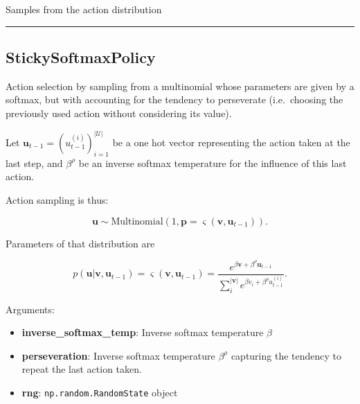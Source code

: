 \begin{Shaded}
\begin{Highlighting}[]
\end{Highlighting}
\end{Shaded}

Samples from the action distribution

\begin{center}\rule{0.5\linewidth}{\linethickness}\end{center}

\subsection{StickySoftmaxPolicy}\label{stickysoftmaxpolicy}

\begin{Shaded}
\begin{Highlighting}[]
\end{Highlighting}
\end{Shaded}

Action selection by sampling from a multinomial whose parameters are
given by a softmax, but with accounting for the tendency to perseverate
(i.e.~choosing the previously used action without considering its
value).

Let \(\mathbf u_{t-1} = (u_{t-1}^{(i)})_{i=1}^{|\mathcal U|}\) be a one
hot vector representing the action taken at the last step, and
\(\beta^\rho\) be an inverse softmax temperature for the influence of
this last action.

Action sampling is thus:

\[
\mathbf u \sim \mathrm{Multinomial}(1, \mathbf p=\varsigma(\mathbf v, \mathbf u_{t-1})).
\]

Parameters of that distribution are

\[
p(\mathbf u|\mathbf v, \mathbf u_{t-1}) = \varsigma(\mathbf v, \mathbf u_{t-1}) = \frac{e^{\beta \mathbf v + \beta^\rho \mathbf u_{t-1}}}{\sum_{i}^{|\mathbf v|} e^{\beta v_i + \beta^\rho u_{t-1}^{(i)}}}.
\]

Arguments:

\begin{itemize}
\tightlist
\item
  \textbf{inverse\_softmax\_temp}: Inverse softmax temperature \(\beta\)
\item
  \textbf{perseveration}: Inverse softmax temperature \(\beta^\rho\)
  capturing the tendency to repeat the last action taken.
\item
  \textbf{rng}: \texttt{np.random.RandomState} object
\end{itemize}

